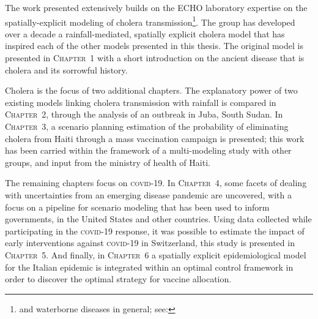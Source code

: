 The work presented extensively builds on the ECHO laboratory expertise on the spatially-explicit modeling of cholera transmission\footnote[][2\baselineskip]{and waterborne diseases in general; see: }. The group has developed over a decade a rainfall-mediated, spatially explicit cholera model that has inspired each of the other models presented in this thesis. The original model is presented in \textsc{Chapter~1} with a short introduction on the ancient disease that is cholera and its sorrowful history.

Cholera is the focus of two additional chapters. The explanatory power of two existing models linking cholera transmission with rainfall is compared in \textsc{Chapter~2}, through the analysis of an outbreak in Juba, South Sudan. In \textsc{Chapter~3}, a scenario planning estimation of the probability of eliminating cholera from Haiti through a mass vaccination campaign is presented; this work has been carried within the framework of a multi-modeling study with other groups, and input from the ministry of health of Haiti.

The remaining chapters focus on \textsc{covid}-19. In \textsc{Chapter~4}, some facets of dealing with uncertainties from an emerging disease pandemic are uncovered, with a focus on a pipeline for scenario modeling that has been used to inform governments, in the United States and other countries. 
Using data collected while participating in the \textsc{covid}-19 response, it was possible to estimate the impact of early interventions against \textsc{covid}-19 in Switzerland, this study is presented in \textsc{Chapter~5}. %
And finally, in \textsc{Chapter~6} a spatially explicit epidemiological model for the Italian epidemic is integrated within an optimal control framework in order to discover the optimal strategy for vaccine allocation.


